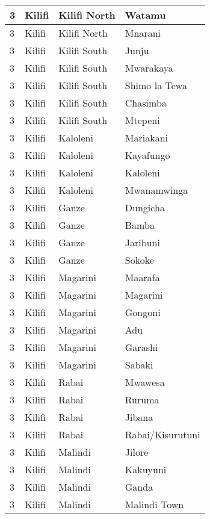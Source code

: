 \begin{table}[!ht]
\begin{tabular}{|l|l|l|l|}
        3 & Kilifi & Kilifi North & Watamu \\ \hline
        3 & Kilifi & Kilifi North & Mnarani \\ \hline
        3 & Kilifi & Kilifi South & Junju \\ \hline
        3 & Kilifi & Kilifi South & Mwarakaya \\ \hline
        3 & Kilifi & Kilifi South & Shimo la Tewa \\ \hline
        3 & Kilifi & Kilifi South & Chasimba \\ \hline
        3 & Kilifi & Kilifi South & Mtepeni \\ \hline
        3 & Kilifi & Kaloleni & Mariakani \\ \hline
        3 & Kilifi & Kaloleni & Kayafungo \\ \hline
        3 & Kilifi & Kaloleni & Kaloleni \\ \hline
        3 & Kilifi & Kaloleni & Mwanamwinga \\ \hline
        3 & Kilifi & Ganze & Dungicha \\ \hline
        3 & Kilifi & Ganze & Bamba \\ \hline
        3 & Kilifi & Ganze & Jaribuni \\ \hline
        3 & Kilifi & Ganze & Sokoke \\ \hline
        3 & Kilifi & Magarini & Maarafa \\ \hline
        3 & Kilifi & Magarini & Magarini \\ \hline
        3 & Kilifi & Magarini & Gongoni \\ \hline
        3 & Kilifi & Magarini & Adu \\ \hline
        3 & Kilifi & Magarini & Garashi \\ \hline
        3 & Kilifi & Magarini & Sabaki \\ \hline
        3 & Kilifi & Rabai & Mwawesa \\ \hline
        3 & Kilifi & Rabai & Ruruma \\ \hline
        3 & Kilifi & Rabai & Jibana \\ \hline
        3 & Kilifi & Rabai & Rabai/Kisurutuni \\ \hline
        3 & Kilifi & Malindi & Jilore \\ \hline
        3 & Kilifi & Malindi & Kakuyuni \\ \hline
        3 & Kilifi & Malindi & Ganda \\ \hline
        3 & Kilifi & Malindi & Malindi Town \\ \hline

\end{tabular}
\end{table}
